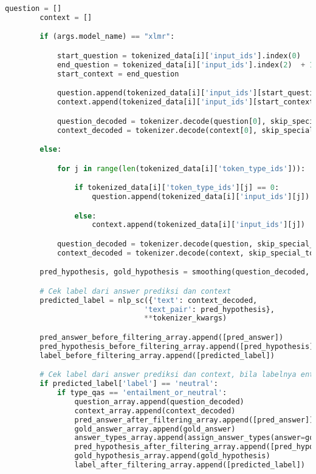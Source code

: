 \begin{lstlisting}[language=Python, caption= Melakukan \emph{filtering} jawaban]
        question = []
        context = []

        if (args.model_name) == "xlmr":

            start_question = tokenized_data[i]['input_ids'].index(0)
            end_question = tokenized_data[i]['input_ids'].index(2)  + 1
            start_context = end_question

            question.append(tokenized_data[i]['input_ids'][start_question: end_question])
            context.append(tokenized_data[i]['input_ids'][start_context: ])

            question_decoded = tokenizer.decode(question[0], skip_special_tokens=True)
            context_decoded = tokenizer.decode(context[0], skip_special_tokens=True)

        else:

            for j in range(len(tokenized_data[i]['token_type_ids'])):

                if tokenized_data[i]['token_type_ids'][j] == 0:
                    question.append(tokenized_data[i]['input_ids'][j])

                else:
                    context.append(tokenized_data[i]['input_ids'][j])

            question_decoded = tokenizer.decode(question, skip_special_tokens=True)
            context_decoded = tokenizer.decode(context, skip_special_tokens=True)

        pred_hypothesis, gold_hypothesis = smoothing(question_decoded, pred_answer, gold_answer, type_smoothing)

        # Cek label dari answer prediksi dan context
        predicted_label = nlp_sc({'text': context_decoded, 
                                'text_pair': pred_hypothesis}, 
                                **tokenizer_kwargs)

        pred_answer_before_filtering_array.append([pred_answer])
        pred_hypothesis_before_filtering_array.append([pred_hypothesis])
        label_before_filtering_array.append([predicted_label])

        # Cek label dari answer prediksi dan context, bila labelnya entailment (atau neutral), maka answernya jadi hasil akhir
        if predicted_label['label'] == 'neutral':
            if type_qas == 'entailment_or_neutral':
                question_array.append(question_decoded)
                context_array.append(context_decoded)
                pred_answer_after_filtering_array.append([pred_answer])
                gold_answer_array.append(gold_answer)
                answer_types_array.append(assign_answer_types(answer=gold_answer))
                pred_hypothesis_after_filtering_array.append([pred_hypothesis])
                gold_hypothesis_array.append(gold_hypothesis)
                label_after_filtering_array.append([predicted_label])


\end{lstlisting}
